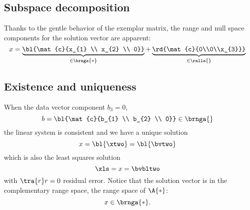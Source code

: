 \subsection{Subspace decomposition}
\ftola
Thanks to the gentle behavior of the exemplar matrix, the range and null space components for the solution vector are apparent:
  \begin{equation}
      x = \underbrace{\bl{\mat{c}{x_{1} \\ x_{2} \\ 0}}}_{\in\brnga{*}} + \underbrace{\rd{\mat{c}{0\\0\\x_{3}}}}_{\in\rnlla{}}
  \end{equation}

\subsection{Existence and uniqueness}
When the data vector component $b_{3} = 0$, 
  \begin{equation}
      b = \bl{\mat{c}{b_{1} \\ b_{2} \\ 0}} \in \brnga{}
  \end{equation}
the linear system is consistent and we have a unique solution 
  \begin{equation}
    x = \bl{\xtwo} = \bl{\bvtwo}
  \end{equation}
which is also the least squares solution
  \begin{equation}
    \xls = x = \bvbltwo
  \end{equation}
with $\tra{r}r = 0$ residual error. Notice that the solution vector is in the complementary range space, the range space of $\A{*}$:
  \begin{equation}
      x \in \brnga{*}.
  \end{equation}

